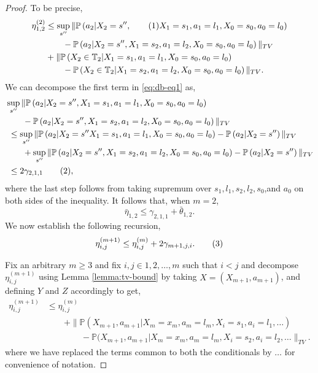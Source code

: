 \documentclass[opre,sglanonrev]{informs4}
\numberwithin{equation}{section}
\newcommand{\pow}[1]{^{(#1)}}
\newcommand{\lp}{\left(}
\newcommand{\rp}{\right)}
\newcommand{\Pbb}{\mathbb{P}}
\newcommand{\Tbb}{\mathbb{T}}
\newcommand\numberthis{\addtocounter{equation}{1}\tag{\theequation}}
\newcommand{\prob}{\Pbb}
\newcommand{\probl}{\prob}
\begin{document}
\begin{APPENDICES}
\begin{proof}
To be precise, 
\begin{align*}
    \eta_{1,2}\pow{2}& \leq \sup_{s''}\| \probl\lp a_2|X_2=s'',\numberthis\label{eq:db-eq1} X_1=s_1,a_1=l_1,X_0=s_0,a_0=l_0\rp\\
    & \qquad -\probl\lp a_2|X_2=s'', X_1=s_2,a_1=l_2,X_0=s_0,a_0=l_0\rp\|_{TV}\\
    & + \|\probl\lp X_2\in \Tbb_2| X_1=s_1,a_1=l_1,X_0=s_0,a_0=l_0\rp\\
    & \qquad -\probl\lp X_2\in \Tbb_2| X_1=s_2,a_1=l_2,X_0=s_0,a_0=l_0\rp\|_{TV}.
\end{align*}
We can decompose the first term in \cref{eq:db-eq1} as,
\begin{align*}
    &\sup_{s''}\| \probl\lp a_2|X_2=s'', X_1=s_1,a_1=l_1,X_0=s_0,a_0=l_0\rp\\
    & \qquad -\probl\lp a_2|X_2=s'', X_1=s_2,a_1=l_2,X_0=s_0,a_0=l_0\rp\|_{TV}\\
    & \ \leq   \sup_{s''}\| \probl\lp a_2|X_2=s'' X_1=s_1,a_1=l_1,X_0=s_0,a_0=l_0\rp- \probl\lp a_2|X_2=s''\rp\|_{TV}\\
    & \qquad + \sup_{s''}\|\probl\lp a_2|X_2=s'', X_1=s_2,a_1=l_2,X_0=s_0,a_0=l_0\rp-\probl\lp a_2|X_2=s''\rp\|_{TV}\\
    & \ \leq 2\gamma_{2,1,1}\numberthis\label{eq:db-eq3},
\end{align*}
where the last step follows from taking supremum over $s_1,l_1,s_2,l_2,s_0$,and $a_0$ on both sides of the inequality. 
It follows that, when $m=2$,
\[
 \bar\eta_{1,2}\leq \gamma_{2,1,1}+\bar\theta_{1,2}.
\]
We now establish the following recursion,
\begin{align*}
 \eta_{i,j}^{(m+1)} \leq \eta_{i,j}^{(m)}+2\gamma_{m+1,j,i}.\numberthis\label{eq:db-eq5}    
\end{align*}

Fix an arbitrary $m\geq 3$ and fix $i,j\in{1,2,\dots,m}$ such that $i<j$ and
decompose $\eta_{i,j}\pow{m+1}$ using Lemma \ref{lemma:tv-bound} by taking $X=(X_{m+1},a_{m+1})$, and defining $Y$ and $Z$ accordingly to get,
\begin{align*}
    \eta_{i,j}^{(m+1)}& \leq \eta_{i,j}^{(m)}\\
    & \qquad + \|\probl(X_{m+1},a_{m+1}|X_{m}=x_{m},a_{m}=l_{m},X_i=s_1,a_i=l_1,\dots)\\
    & \qquad \qquad -\probl(X_{m+1},a_{m+1}|X_{m}=x_{m},a_{m}=l_{m},X_i=s_2,a_i=l_2,\dots\|_{TV}.
\end{align*}
where we have replaced the terms common to both the conditionals by $\dots$ for convenience of notation.


\end{proof}
\end{APPENDICES}
\end{document}
